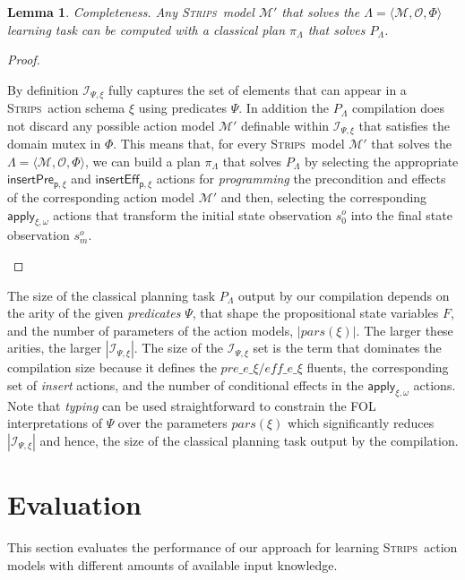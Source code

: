 \documentclass{article}
\newcommand{\tup}[1]{{\langle #1 \rangle}}
\newcommand{\strips}{\textsc{Strips}}
\newtheorem{mylemma}[mytheorem]{Lemma}
\begin{document}
\begin{mylemma}
Completeness. Any \strips\ model $\mathcal{M}'$ that solves the $\Lambda=\tup{\mathcal{M},{\mathcal O},\Phi}$ learning task can be computed with a classical plan $\pi_{\Lambda}$ that solves $P_{\Lambda}$.
\end{mylemma}

\begin{proof}[Proof]
\begin{small}
By definition ${\mathcal I}_{\Psi,\xi}$ fully captures the set of elements that can appear in a \strips\ action schema $\xi$ using predicates $\Psi$. In addition the $P_{\Lambda}$ compilation does not discard any possible action model $\mathcal{M}'$ definable within ${\mathcal I}_{\Psi,\xi}$ that satisfies the domain mutex in $\Phi$. This means that, for every \strips\ model $\mathcal{M}'$ that solves the $\Lambda=\tup{\mathcal{M},{\mathcal O},\Phi}$, we can build a plan $\pi_{\Lambda}$ that solves $P_{\Lambda}$ by selecting the appropriate $\mathsf{insertPre_{p,\xi}}$ and $\mathsf{insertEff_{p,\xi}}$ actions for {\em programming} the precondition and effects of the corresponding action model $\mathcal{M}'$ and then, selecting the corresponding $\mathsf{apply_{\xi,\omega}}$ actions that transform the initial state observation $s_0^o$ into the final state observation $s_m^o$.
\end{small}
\end{proof}

The size of the classical planning task $P_{\Lambda}$ output by our compilation depends on the arity of the given {\em predicates} $\Psi$, that shape the propositional state variables $F$, and the number of parameters of the action models, $|pars(\xi)|$. The larger these arities, the larger $|{\mathcal I}_{\Psi,\xi}|$. The size of the ${\mathcal I}_{\Psi,\xi}$ set is the term that dominates the compilation size because it defines the $pre\_e\_\xi/eff\_e\_\xi$ fluents, the corresponding set of {\em insert} actions, and the number of conditional effects in the $\mathsf{apply_{\xi,\omega}}$ actions. Note that {\em typing} can be used straightforward to constrain the FOL interpretations of $\Psi$ over the parameters $pars(\xi)$ which significantly reduces $|{\mathcal I}_{\Psi,\xi}|$ and hence, the size of the classical planning task output by the compilation.







\section{Evaluation}
\label{sec:evaluation}
This section evaluates the performance of our approach for learning \strips\ action models with different amounts of available input knowledge.
\end{document}
